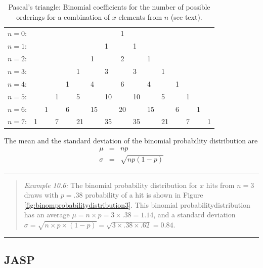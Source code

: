 \documentclass[
]{book}
\begin{document}
\begin{longtable}[]{@{}llllllllclllllll@{}}
\caption{\label{tab:pascaltriangle} Pascal's triangle: Binomial coefficients for the
number of possible orderings for a combination of \(x\) elements from \(n\) (see text).}\tabularnewline
\toprule\noalign{}
\endfirsthead
\endhead
\bottomrule\noalign{}
\endlastfoot
\(n= 0\): & & & & & & & & 1 & & & & & & & \\
\(n= 1\): & & & & & & & 1 & & 1 & & & & & & \\
\(n= 2\): & & & & & & 1 & & 2 & & 1 & & & & & \\
\(n= 3\): & & & & & 1 & & 3 & & 3 & & 1 & & & & \\
\(n= 4\): & & & & 1 & & 4 & & 6 & & 4 & & 1 & & & \\
\(n= 5\): & & & 1 & & 5 & & 10 & & 10 & & 5 & & 1 & & \\
\(n= 6\): & & 1 & & 6 & & 15 & & 20 & & 15 & & 6 & & 1 & \\
\(n= 7\): & 1 & & 7 & & 21 & & 35 & & 35 & & 21 & & 7 & & 1 \\
\end{longtable}

The mean and the standard deviation of the binomial probability distribution
are \[\begin{aligned}
    \mu & = & np \\
    \sigma & = & \sqrt{ np(1-p) }\end{aligned}\]

\begin{center}\rule{0.5\linewidth}{0.5pt}\end{center}

\begin{quote}
\emph{Example 10.6:}
The binomial probability distribution for \(x\) hits from \(n=3\) draws with
\(p=.38\) probability of a hit is shown in
Figure \ref{fig:binomprobabilitydistribution3}. This binomial probabilitydistribution has an average \(\mu=n \times p = 3 \times .38 = 1.14\), and a standard deviation
\(\sigma = \sqrt{n \times p \times (1-p)} = \sqrt{ 3 \times .38 \times .62} = 0.84\).
\end{quote}

\begin{center}\rule{0.5\linewidth}{0.5pt}\end{center}

\hypertarget{jasp-4}{%
\subsection{JASP}\label{jasp-4}}
\end{document}
